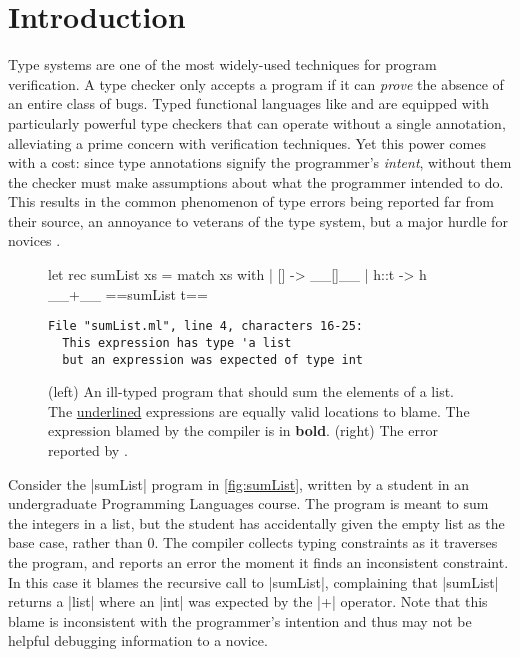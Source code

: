 \section{Introduction}
\label{sec:introduction}

Type systems are one of the most widely-used techniques for program
verification. A type checker only accepts a program if it can
\emph{prove} the absence of an entire class of bugs.
%
Typed functional languages like \ocaml and \haskell are equipped with
particularly powerful type checkers that can operate without a single
annotation, alleviating a prime concern with verification techniques.
%
Yet this power comes with a cost: since type annotations signify the
programmer's \emph{intent}, without them the checker must
make assumptions about what the programmer intended to do.
%
This results in the common phenomenon of type errors being reported far
from their source, an annoyance to veterans of the type system, but a
major hurdle for novices \citep{Wand1986-nw,Joosten1993-yx}.

\begin{figure}[ht]
\begin{minipage}{0.45\linewidth}
\begin{ecode}
  let rec sumList xs =
    match xs with
    | []   -> __[]__
    | h::t -> h __+__ ==sumList t==
\end{ecode}
\end{minipage}
\begin{minipage}{0.49\linewidth}
\begin{verbatim}
File "sumList.ml", line 4, characters 16-25:
  This expression has type 'a list
  but an expression was expected of type int
\end{verbatim}
\end{minipage}
\caption{(left) An ill-typed \ocaml program that should sum the elements of a
  list. The \underline{underlined} expressions are equally valid
  locations to blame. The expression blamed by the \ocaml compiler
  is in \textbf{bold}.
  (right) The error reported by \ocaml.}
\label{fig:sumList}
\end{figure}
%
Consider the |sumList| program in \autoref{fig:sumList}, written by a
student in an undergraduate Programming Languages course.
%
The program is meant to sum the integers in a list, but the student has
accidentally given the empty list as the base case, rather than 0.
%
The \ocaml compiler collects typing constraints as it traverses the
program, and reports an error the moment it finds an inconsistent
constraint.
%
In this case it blames the recursive call to |sumList|, complaining that
|sumList| returns a |list| where an |int| was expected by the |+|
operator. Note that this blame is inconsistent with the programmer's
intention and thus may not be helpful debugging information to a novice.

